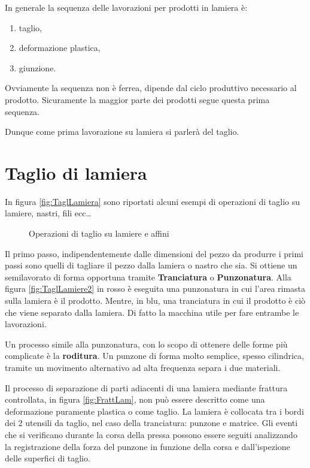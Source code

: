 In generale la sequenza delle lavorazioni per prodotti in lamiera è:
\begin{enumerate}
\item taglio,
\item deformazione plastica,
\item giunzione.
\end{enumerate}
Ovviamente la sequenza non è ferrea, dipende dal ciclo produttivo necessario al prodotto. Sicuramente la maggior parte dei prodotti segue questa prima sequenza.

Dunque come prima lavorazione su lamiera si parlerà del taglio.

\section{Taglio di lamiera}
In figura \ref{fig:TaglLamiera} sono riportati alcuni esempi di operazioni di taglio su lamiere, nastri, fili ecc\dots

\begin{figure}
\centering
{}\quad
{}
\caption{Operazioni di taglio su lamiere e affini}
\label{fig:TaglLam}
\end{figure}

Il primo passo, indipendentemente dalle dimensioni del pezzo da produrre i primi passi sono quelli di tagliare il pezzo dalla lamiera o nastro che sia.
Si ottiene un semilavorato di forma opportuna tramite \textbf{Tranciatura} o \textbf{Punzonatura}.
Alla figura \ref{fig:TaglLamiere2} in rosso è eseguita una punzonatura in cui l'area rimasta sulla lamiera è il prodotto. Mentre, in blu, una tranciatura in cui il prodotto è ciò che viene separato dalla lamiera.
Di fatto la macchina utile per fare entrambe le lavorazioni.

Un processo simile alla punzonatura, con lo scopo di ottenere delle forme più complicate è la \textbf{roditura}. Un punzone di forma molto semplice, spesso cilindrica, tramite un movimento alternativo ad alta frequenza separa i due materiali.

Il processo di separazione di parti adiacenti di una lamiera mediante frattura controllata, in figura \ref{fig:FrattLam}, non può essere descritto come una deformazione puramente plastica o come taglio.
La lamiera è collocata tra i bordi dei 2 utensili da taglio, nel caso della tranciatura: punzone e matrice. Gli eventi che si verificano durante la corsa della pressa possono essere seguiti analizzando la registrazione della forza del punzone in funzione della corsa e dall'ispezione delle superfici di taglio.

